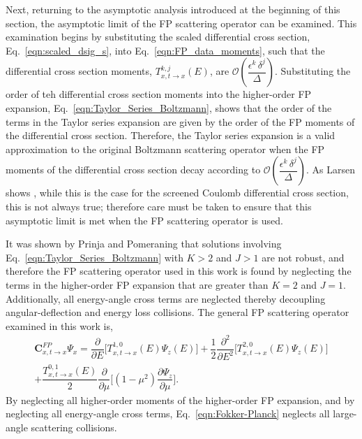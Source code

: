 \documentclass[../main.tex]{subfiles}
\begin{document}
Next, returning to the asymptotic analysis introduced at the beginning of this section, the asymptotic limit of the FP scattering operator can be examined. This examination begins by substituting the scaled differential cross section, Eq.~\eqref{eqn:scaled_dsig_s}, into Eq.~\eqref{eqn:FP_data_moments}, such that the differential cross section moments, $T_{x,t\rightarrow x}^{k,j}(E)$, are $\mathcal{O}\left(\dfrac{\epsilon^k \, \delta^j}{\Delta}\right)$. Substituting the order of teh differential cross section moments into the higher-order FP expansion, Eq.~\eqref{eqn:Taylor_Series_Boltzmann}, shows that the order of the terms in the Taylor series expansion are given by the order of the FP moments of the differential cross section. Therefore, the Taylor series expansion is a valid approximation to the original Boltzmann scattering operator when the FP moments of the differential cross section decay according to $\mathcal{O}\left(\dfrac{\epsilon^k \, \delta^j}{\Delta}\right)$. As Larsen shows \cite{Larsen-1999}, while this is the case for the screened Coulomb differential cross section, this is not always true; therefore care must be taken to ensure that this asymptotic limit is met when the FP scattering operator is used.

It was shown by Prinja and Pomeraning \cite{Prinja-2001} that solutions involving Eq.~\eqref{eqn:Taylor_Series_Boltzmann} with $K>2$ and $J>1$ are not robust, and therefore the FP scattering operator used in this work is found by neglecting the terms in the higher-order FP expansion that are greater than $K=2$ and $J=1$. Additionally, all energy-angle cross terms are neglected thereby decoupling angular-deflection and energy loss collisions. The general FP scattering operator examined in this work is,
\begin{multline} \label{eqn:Fokker-Planck}
    \boldsymbol{C}_{x,t \rightarrow x}^{FP} \Psi_x = \dfrac{\partial}{\partial E} \Big[ T_{x,t \rightarrow x}^{1,0}(E) \Psi_z(E) \Big] + \dfrac{1}{2} \dfrac{\partial^2}{\partial E^2} \Big[ T_{x,t \rightarrow x}^{2,0}(E) \Psi_z(E) \Big] \\
    + \dfrac{T_{x,t \rightarrow x}^{0,1}(E)}{2} \dfrac{\partial}{\partial \mu} \Big[(1-\mu^2) \dfrac{\partial \Psi_z}{\partial \mu}\Big].
\end{multline}
By neglecting all higher-order moments of the higher-order FP expansion, and by neglecting all energy-angle cross terms, Eq.~\eqref{eqn:Fokker-Planck} neglects all large-angle scattering collisions.
\end{document}
